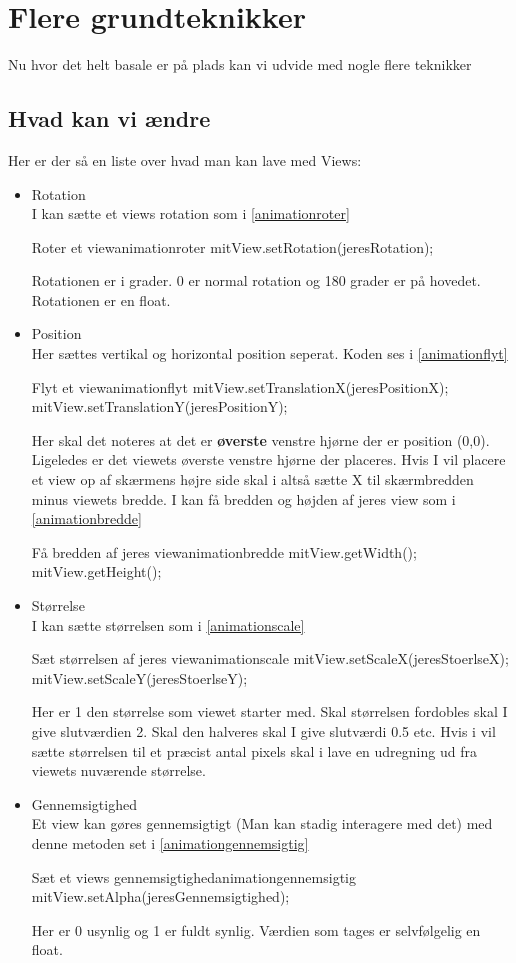 \section{Flere grundteknikker}
Nu hvor det helt basale er på plads kan vi udvide med nogle flere teknikker
\subsection{Hvad kan vi ændre}
Her er der så en liste over hvad man kan lave med Views:\\
\begin{itemize}
	\item Rotation \\
	I kan sætte et views rotation som i \autoref{animationroter}
	\begin{JavaCode}{Roter et view}{animationroter}
		mitView.setRotation(jeresRotation);
	\end{JavaCode}
	Rotationen er i grader. 0 er normal rotation og 180 grader er på hovedet. Rotationen er en float. 
	\\
	\item Position \\
	Her sættes vertikal og horizontal position seperat. Koden ses i \autoref{animationflyt}
	\begin{JavaCode}{Flyt et view}{animationflyt}
		mitView.setTranslationX(jeresPositionX);
		mitView.setTranslationY(jeresPositionY);
	\end{JavaCode}
	Her skal det noteres at det er \textbf{øverste} venstre hjørne der er position (0,0). Ligeledes er det viewets øverste venstre hjørne der placeres. Hvis I vil placere et view op af skærmens højre side skal i altså sætte X til skærmbredden minus viewets bredde. I kan få bredden og højden af jeres view som i \autoref{animationbredde}
	\begin{JavaCode}{Få bredden af jeres view}{animationbredde}
		mitView.getWidth();
		mitView.getHeight();
	\end{JavaCode}
	\item Størrelse \\
	I kan sætte størrelsen som i \autoref{animationscale} 
	\begin{JavaCode}{Sæt størrelsen af jeres view}{animationscale}
		mitView.setScaleX(jeresStoerlseX);
		mitView.setScaleY(jeresStoerlseY);
	\end{JavaCode}
	Her er 1 den størrelse som viewet starter med. Skal størrelsen fordobles skal I give slutværdien 2. Skal den halveres skal I give slutværdi 0.5 etc. Hvis i vil sætte størrelsen til et præcist antal pixels skal i lave en udregning ud fra viewets nuværende størrelse. \\
	\item Gennemsigtighed \\
	Et view kan gøres gennemsigtigt (Man kan stadig interagere med det) med denne metoden set i \autoref{animationgennemsigtig}
	\begin{JavaCode}{Sæt et views gennemsigtighed}{animationgennemsigtig}
		mitView.setAlpha(jeresGennemsigtighed);
	\end{JavaCode}
	Her er 0 usynlig og 1 er fuldt synlig. Værdien som tages er selvfølgelig en float.
\end{itemize}
